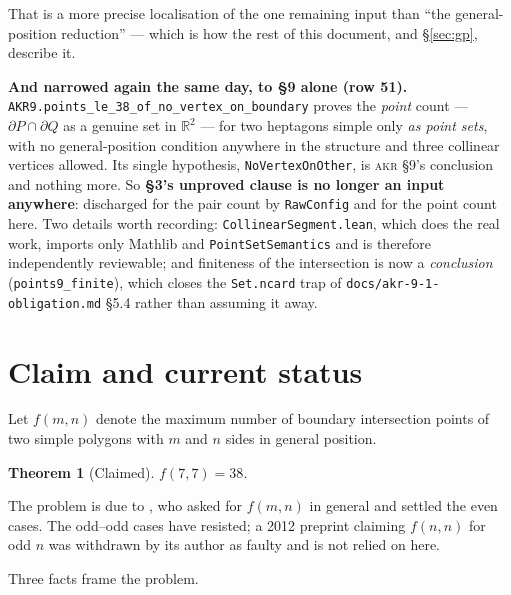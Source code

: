 \documentclass[11pt,a4paper]{article}
\theoremstyle{plain}
\newtheorem{theorem}{Theorem}
\theoremstyle{definition}
\theoremstyle{remark}
\begin{document}
That is a more precise localisation of the one remaining input than
``the general-position reduction'' --- which is how the rest of this document,
and \S\ref{sec:gp}, describe it.

\medskip

\noindent\textbf{And narrowed again the same day, to \S9 alone (row 51).}
\texttt{AKR9.points\_le\_38\_of\_no\_vertex\_on\_boundary} proves the
\emph{point} count --- $\partial P\cap\partial Q$ as a genuine set in
$\mathbb{R}^2$ --- for two heptagons simple only \emph{as point sets}, with no
general-position condition anywhere in the structure and three collinear
vertices allowed. Its single hypothesis, \texttt{NoVertexOnOther}, is
\textsc{akr} \S9's conclusion and nothing more. So \textbf{\S3's unproved clause
is no longer an input anywhere}: discharged for the pair count by
\texttt{RawConfig} and for the point count here. Two details worth recording:
\texttt{CollinearSegment.lean}, which does the real work, imports only Mathlib
and \texttt{PointSetSemantics} and is therefore independently reviewable; and
finiteness of the intersection is now a \emph{conclusion}
(\texttt{points9\_finite}), which closes the \texttt{Set.ncard} trap of
\texttt{docs/akr-9-1-obligation.md} \S5.4 rather than assuming it away.

\section{Claim and current status}

Let $f(m,n)$ denote the maximum number of boundary intersection points of two
simple polygons with $m$ and $n$ sides in general position.

\begin{theorem}[Claimed]\label{thm:main}
$f(7,7)=38$.
\end{theorem}

The problem is due to \cite{DillencourtMountSaalfeld1993}, who asked for
$f(m,n)$ in general and settled the even cases. The odd--odd cases have resisted;
a 2012 preprint claiming $f(n,n)$ for odd $n$ \cite{Gunther2012} was withdrawn by
its author as faulty and is not relied on here.

Three facts frame the problem.
\end{document}
